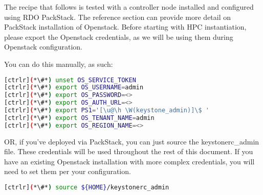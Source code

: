 	The recipe that follows is tested with a controller node installed and configured using RDO PackStack.
	The reference section can provide more detail on PackStack installation of Openstack.
	Before starting with HPC instantiation, please export the Openstack credentials, as we will be using them during Openstack configuration. 

	You can do this manually, as such:

\begin{lstlisting}[language=bash,keywords={}]
[ctrlr](*\#*) unset OS_SERVICE_TOKEN
[ctrlr](*\#*) export OS_USERNAME=admin
[ctrlr](*\#*) export OS_PASSWORD=<>
[ctrlr](*\#*) export OS_AUTH_URL=<>
[ctrlr](*\#*) export PS1='[\u@\h \W(keystone_admin)]\$ '
[ctrlr](*\#*) export OS_TENANT_NAME=admin
[ctrlr](*\#*) export OS_REGION_NAME=<>  
\end{lstlisting}

	OR, if you've deployed via PackStack, you can just source the keystonerc\_admin file. These credentials will be used throughout the rest of this document. If you have an existing Openstack installation with more complex credentials, you will need to set them per your configuration.

\begin{lstlisting}[language=bash,keywords={}]
[ctrlr](*\#*) source ${HOME}/keystonerc_admin
\end{lstlisting}
